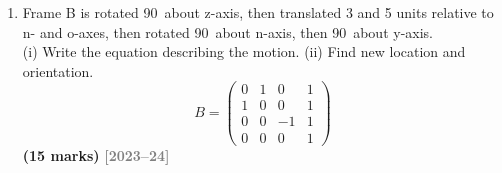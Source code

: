 \documentclass[12pt,a3paper]{article}
\newcommand{\yr}[1]{\hfill\textcolor{gray}{\small\textbf{[#1]}}}
\newcommand{\mk}[1]{\textcolor{orange!70!black}{\small\textbf{(#1 marks)}}}
\begin{document}
\begin{enumerate}
\begin{tcolorbox}[enhanced,breakable,ansbox,colback=cB!4,colframe=cB,
  boxrule=0.8pt,arc=5pt,
  title={\textbf{Answer}},fonttitle=\bfseries\color{white},
  colbacktitle=cB]
\textbf{Solving the three equations:}

\begin{enumerate}[label=\textbf{\roman*.}]
  \item \textbf{From $z$-component} (unchanged by $\mathrm{Trans}(x)$
    and $\mathrm{Rot}(z)$):
    \[
      3\cos\theta - 3\sin\theta = 2
      \implies \sqrt{2}\cos(\theta+45\textdegree) = \dfrac{2}{3} \cdot \dfrac{\sqrt{2}}{\sqrt{2}}
    \]
    Writing $3(\cos\theta - \sin\theta) = 2$ as $R\cos(\theta+\psi)=2$
    with $R = 3\sqrt{2}$, $\psi=45\textdegree$:
    \[
      \cos(\theta + 45\textdegree) = \frac{2}{3\sqrt{2}}
      \implies \theta + 45\textdegree = \pm\cos^{-1}\!\left(\frac{\sqrt{2}}{3}\right)
      \implies \boxed{\theta \approx 16.87\textdegree}
    \]

  \item \textbf{From $x$- and $y$-components:}
    Since $P_{2y} = 0$, after $\mathrm{Rot}(z,\phi)$:
    \[
      x_3 = x_2\cos\phi = 4, \qquad y_3 = x_2\sin\phi = 4
      \implies \tan\phi = 1 \implies \boxed{\phi = 45\textdegree}
    \]
    Then $x_2 = \dfrac{4}{\cos45\textdegree} = 4\sqrt{2}$, so:
    \[
      d = 4\sqrt{2} - (3\cos\theta + 3\sin\theta)
      \approx 5.657 - 3.742
      \implies \boxed{d \approx 1.915\text{ units}}
    \]
\end{enumerate}

\textbf{Summary:}
\[
  \theta \approx 16.87\textdegree,\qquad d \approx 1.915\text{ units},\qquad \phi = 45\textdegree
\]

\textit{Note: A second mathematical solution $\theta \approx -106.87\textdegree$,
$d \approx 9.40$ also satisfies the equations but is typically rejected
due to physical joint constraints.}

\end{tcolorbox}

\item \label{qlabel:C2-Q2}
Frame B is rotated 90\textdegree\ about z-axis, then translated 3 and 5
units relative to n- and o-axes, then rotated 90\textdegree\ about
n-axis, then 90\textdegree\ about y-axis.\\
(i) Write the equation describing the motion.
(ii) Find new location and orientation.
\[
  B = \begin{pmatrix}
    0&1&0&1\\1&0&0&1\\0&0&{-1}&1\\0&0&0&1
  \end{pmatrix}
\]
\mk{15}
\yr{2023--24}


\end{enumerate}
\end{document}
